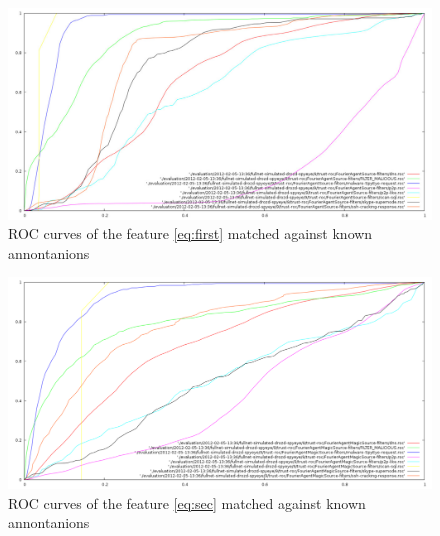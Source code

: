 \documentclass[a4paper,journal]{IEEEtran}
\begin{document}
%
%  
%
%
%
%
%
%
%

\onecolumn

\begin{figure}[t!]%
  \centering
  \includegraphics[width=160mm]{norm}
  \caption{ROC curves of the feature \ref{eq:first} matched against known annontanions}
  \label{fig:norm}
\end{figure}


\begin{figure}[t!]%
  \centering
  \includegraphics[width=160mm]{magic}
  \caption{ROC curves of the feature \ref{eq:sec} matched against known annontanions}
  \label{fig:magic}
\end{figure}


\end{document}
